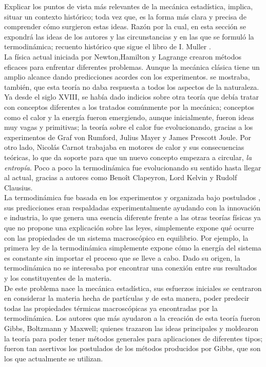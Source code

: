 Explicar los puntos de vista más relevantes de la mecánica estadística, implica, situar un contexto histórico; toda vez que, es la forma más clara y precisa de comprender cómo surgieron estas ideas. Razón por la cual, en esta sección se expondrá las ideas de los autores y las circunstancias y en las que se formuló la termodinámica; recuento histórico que sigue el libro de I. Muller  \cite{MullerHistory}.
\\
La física actual iniciada por Newton,Hamilton y Lagrange crearon métodos  eficaces para enfrentar  diferentes problemas. Aunque la mecánica clásica tiene un amplio alcance dando predicciones acordes con los experimentos.  se mostraba, también, que esta teoría no daba respuesta a todos los aspectos de la naturaleza. Ya desde el siglo XVIII, se había dado indicios sobre otra teoría que debía tratar con conceptos diferentes a los tratados comúnmente por la mecánica; conceptos como el calor y la energía fueron emergiendo, aunque inicialmente, fueron ideas muy vagas y primitivas; la teoría sobre el calor fue evolucionando, gracias a los experimentos de Graf von Rumford, Julius Mayer y James Prescott Joule. Por otro lado, Nicolás Carnot trabajaba en motores de calor y sus consecuencias teóricas, lo que da soporte para que un nuevo concepto empezara a circular, \textit{la entropía}. Poco a poco la termodinámica fue evolucionando su sentido hasta llegar al actual, gracias a autores como Benoît Clapeyron, Lord Kelvin y Rudolf Clausius.
\\
La termodinámica fue basada en los experimentos y organizada bajo postulados \cite{CallenThermo}, sus predicciones eran respaldadas experimentalmente ayudando con la innovación e industria, lo que genera una esencia diferente frente a las otras teorías físicas ya que no propone una explicación sobre las leyes, simplemente expone qué ocurre con las propiedades de un sistema macroscópico en equilibrio. Por ejemplo, la primera ley de la termodinámica simplemente expone cómo la energía del sistema es constante sin importar el proceso que se lleve a cabo. Dado su origen, la termodinámica no se interesaba por encontrar una conexión entre sus resultados y los constituyentes de la materia.
\\
De este problema nace la mecánica estadística, sus esfuerzos iniciales se centraron en considerar la materia hecha de partículas y de esta manera, poder predecir todas las propiedades térmicas macroscópicas ya encontradas por la termodinámica. Los autores que más ayudaron a la creación de esta teoría fueron Gibbs, Boltzmann y Maxwell; quienes trazaron las ideas principales y moldearon la teoría para poder tener métodos generales para aplicaciones de diferentes tipos; fueron tan asertivos los postulados de los métodos producidos por Gibbs, que son los que actualmente se utilizan.
\\
\\
